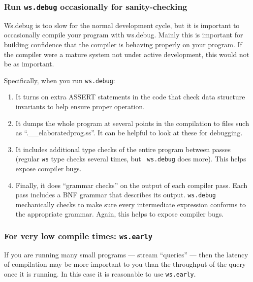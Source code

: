 \documentclass[twocolumn]{report}
\begin{document}
\subsubsection*{Run {\tt \bf ws.debug} occasionally for sanity-checking}

Ws.debug is too slow for the normal development cycle, but it is
important to occasionally compile your program with ws.debug.  Mainly
this is important for building confidence that the compiler is
behaving properly on your program.  If the
compiler were a mature system not under active development, this would
not be as important.  


Specifically, when you run {\tt ws.debug}:

\begin{enumerate}
\item It turns on extra ASSERT statements in the code that check data
structure invariants to help ensure proper operation.

\item It dumps the whole program at several points in the
  compilation to files such as ``.\_\_elaboratedprog.ss''.  It can be
  helpful to look at these for debugging.

\item It includes additional type checks of the entire program between
  passes (regular {\tt ws} type checks several times, but {\tt
  ws.debug} does more).  This helps expose compiler bugs.

\item Finally, it does ``grammar checks'' on the output of each compiler
  pass. Each pass includes a BNF grammar that describes its output.
  {\tt ws.debug} mechanically checks to make sure every intermediate
  expression conforms to the appropriate grammar.  Again, this helps
  to expose compiler bugs.
\end{enumerate}


\subsubsection*{For very low compile times: {\tt \bf ws.early}}

If you are running many small programs --- stream ``queries'' --- then
the latency of compilation may be more important to you than the
throughput of the query once it is running.  In this case it is
reasonable to use {\tt ws.early}.


\end{document}
